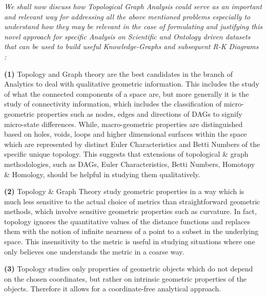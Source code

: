 \textit{We shall now discuss how Topological Graph Analysis could serve as an important and relevant way for addressing all the above mentioned problems especially to understand how they may be relevant in the case of formulating and justifying this novel approach for specific Analysis on Scientific and Ontology driven datasets that can be used to build useful Knowledge-Graphs and subsequent R-K Diagrams :}

\textbf{(1)} Topology and Graph theory are the best candidates in the branch of Analytics to deal with qualitative geometric information. This includes the study of what the connected components of a space are, but more generally it is the study of connectivity information, which includes the classification of micro-geometric properties such as nodes, edges and directions of DAGs \cite{20.0_2013AlgebraOfDAGs} to signify micro-state differences. While, macro-geometric properties are distinguished based on holes, voids, loops and higher dimensional surfaces within the space which are represented by distinct Euler Characteristics and Betti Numbers \cite{01.16_EulerianGraphs} \cite{01.17_EulerianGraphOrientations} of the specific unique topology. This suggests that extensions of topological \& graph methodologies, such as DAGs, Euler Characteristics, Betti Numbers, Homotopy \& Homology, should be helpful in studying them qualitatively.\cite{03.1_2009simplicialHomotopy} \cite{03_1944Homology}

\textbf{(2)} Topology \& Graph Theory study geometric properties in a way which is much less sensitive to the actual choice of metrics than straightforward geometric methods, which involve sensitive geometric properties such as curvature. \cite{01.1_1stCourse2018algebraicTopo} In fact, topology ignores the quantitative values of the distance functions and replaces them with the notion of infinite nearness of a point to a subset in the underlying space. This insensitivity to the metric is useful in studying situations where one only believes one understands the metric in a coarse way.\cite{02.3_2017introductionTDA}

\textbf{(3)} Topology studies only properties of geometric objects which do not depend on the chosen coordinates, but rather on intrinsic geometric properties of the objects. Therefore it allows for a  coordinate-free analytical approach. \cite{01_GCarlssonEpstein2011} \cite{02_carlsson2009topology}

